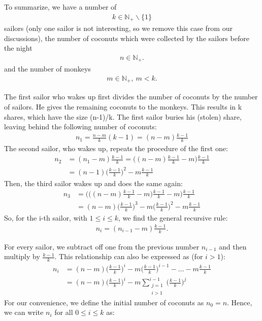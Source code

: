\documentclass[11pt]{article}
\begin{document}
To summarize, we have a number of 
\begin{align}
k \in \mathbb{N_+} \backslash \{ 1\}
\end{align}
sailors (only one sailor is not interesting, so we remove this case from our discussions), the number of coconuts which were collected by the sailors before the night
\begin{align}
n \in \mathbb{N_+}.
\end{align}
and the number of monkeys
\begin{align}
m \in \mathbb{N_+}, \  m < k.
\end{align}

The first sailor who wakes up first divides the number of coconuts by the number of sailors. He gives the remaining coconuts to the monkeys. This results in k shares, which have the size (n-1)/k. The first sailor buries his (stolen) share, leaving behind the following number of coconuts:
\begin{align}
	n_1 = \frac{n-m}{k}(k-1)=(n-m)\frac{k-1}{k} \label{eq:n1}
\end{align}
The second sailor, who wakes up, repeats the procedure of the first one:
\begin{align}
	n_2 &= (n_1-m)\frac{k-1}{k}=\big((n-m)\frac{k-1}{k} -m  \big) \frac{k-1}{k} \\
	&= (n-1) \big(\frac{k-1}{k} \big)^2 - m\frac{k-1}{k}
\end{align}
Then, the third sailor wakes up and does the same again:
\begin{align}
	n_3 &= \Bigg(\bigg((n-m)\frac{k-1}{k}-m\bigg)\frac{k-1}{k} - m\Bigg) \frac{k-1}{k} \\
	&= (n-m) \Big(\frac{k-1}{k}\Big)^3 - m\Big(\frac{k-1}{k}\Big)^2 - m\frac{k-1}{k}
\end{align}
So, for the i-th sailor, with $1 \leq i\leq k$, we find the general recursive rule:
\begin{align}
	n_i = (n_{i-1}-m)\frac{k-1}{k}.
\end{align}

For every sailor, we subtract off one from the previous number $n_{i-1}$ and then multiply by $\frac{k-1}{k}$. This relationship can also be expressed as (for $i>1$):
\begin{align}
	n_i &= (n-m)\bigg(\frac{k-1}{k} \bigg)^i - m\bigg(\frac{k-1}{k} \bigg)^{i-1} - \ldots - m\frac{k-1}{k} \\
	&= (n-m)\bigg(\frac{k-1}{k} \bigg)^i - m\sum_{\substack{j=1 \\ i>1}}^{i-1}\bigg(\frac{k-1}{k} \bigg)^j
\end{align}
For our convenience, we define the initial number of coconuts as $n_0 = n$. Hence, we can write $n_i$ for all $0 \leq i\leq k$ as:
\end{document}
